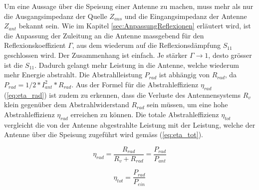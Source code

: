 Um eine Aussage über die Speisung einer Antenne zu machen, muss mehr als nur die Ausgangsimpedanz der Quelle $Z_{aus}$ und die Eingangsimpedanz der Antenne $Z_{ant}$ bekannt sein.  Wie im Kapitel \ref{sec:AnpassungReflexionen} erläutert wird, ist die Anpassung der Zuleitung an die Antenne massgebend für den Reflexionskoeffizient $\Gamma$, aus dem wiederum auf die Reflexionsdämpfung $S_{11}$ geschlossen wird. Der Zusammenhang ist einfach. Je stärker $\Gamma\rightarrow 1$, desto grösser ist die $S_{11}$. Dadurch gelangt mehr Leistung in die Antenne, welche wiederum mehr Energie abstrahlt. Die Abstrahlleistung $P_{rad}$ ist abhängig von $R_{rad}$, da $P_{rad}=1/2*I_{ant}^2*R_{rad}$. Aus der Formel für die Abstrahleffizienz $\eta_{rad}$ (\ref{eq:eta_rad}) ist zudem zu erkennen, dass die Verluste des Antennensystems $R_v$ klein gegenüber dem Abstrahlwiderstand $R_{rad}$ sein müssen, um eine hohe Abstrahleffizienz $\eta_{rad}$ erreichen zu können. 
Die totale Abstrahleffizienz $\eta_{tot}$ vergleicht die von der Antenne abgestrahlte Leistung mit der Leistung, welche der Antenne über die Speisung zugeführt wird gemäss (\ref{eq:eta_tot}).

\begin{equation}
\eta_{rad}=\dfrac{R_{rad}}{R_v + R_{rad}}=\dfrac{P_{rad}}{P_{ant}}
\label{eq:eta_rad}
\end{equation}

\begin{equation}
\eta_{tot}=\dfrac{P_{rad}}{P_{ein}}
\label{eq:eta_tot}
\end{equation}

